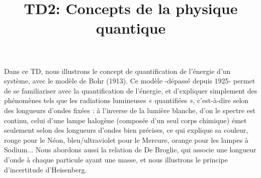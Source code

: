 \documentclass{article}
\author{}
\date{}
\title{TD2: Concepts de la physique quantique}
\begin{document}
\maketitle
Dans ce TD, nous illustrons le concept de quantification de l'énergie d'un système, avec le modèle de Bohr (1913). Ce modèle -dépassé depuis 1925- permet de se familiariser avec la quantification de l'énergie, et d'expliquer simplement des phénomènes tels que les radiations lumineuses « quantifiées », c'est-à-dire selon des longueurs d'ondes fixées : à l'inverse de la lumière blanche, d'on le spectre est continu, celui d'une lampe halogène (composée d'un seul corps chimique) émet seulement selon des longueurs d'ondes bien précises, ce qui explique sa couleur, rouge pour le Néon, bleu/ultraviolet pour le Mercure, orange pour les lampes à Sodium...\newline\newline
\indent Nous abordons aussi la relation de De Broglie, qui associe une longueur d'onde à chaque particule ayant une masse, et nous illustrons le principe d'incertitude d'Heisenberg.\newline\newline
\end{document}
